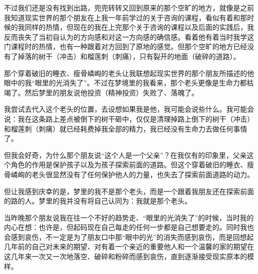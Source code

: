 不过我们还是没有找到出路，兜兜转转又回到原来的那个空旷的地方，就像是之前我知道现实世界的那个朋友在上我一年前学过的关于咨询的课程，看似有着和那时候的我同样的热情，但现在的我在上完那个关于咨询的课程以及后面的实践后，我反而丧失了当初自认为的方向感和对这一方向感的确信感。看着他有着当时我学这门课程时的热情，也有一种跟着对方回到了原地的感觉。但那个空旷的地方已经没有了掉落的树干（冲击）和榴莲刺（刺痛），只有裂开的地面（破碎的道路）。

那个穿着破旧的睡衣、瘦骨嶙峋的老头让我联想起现实世界的那个朋友所描述的他眼中的我\pozhehao{}“眼里的光消失了”。不过在梦境里的我看来，那个老头更像是生命力都枯竭了。然后梦里的朋友说他投资（精神投资）失败了、落魄了。

我尝试去代入这个老头的位置，去设想如果我是他，我可能会说些什么。我可能会说：我在这条路上差点被倒下的树干砸中，仅仅是清理掉路上倒下的树干（冲击）和榴莲刺（刺痛）就已经耗费掉我全部的精力，我已经没有生命力去做任何事情了。

但我会好奇，为什么那个朋友说“这个人是一个父亲”？在我仅有的印象里，父亲这个角色的作用是保护孩子以及为孩子探索前面的道路。但这个穿着破旧的睡衣、瘦骨嶙峋的老头很显然没有了任何保护他人的力量，也失去了探索前面道路的动力。

但让我感到庆幸的是，梦里的我不是那个老头，而是一个跟着我朋友还在探索前面的路的人。梦里的我并没有将自己认同为：我就是那个老头。

当昨晚那个朋友说我在往一个不好的趋势走、“眼里的光消失了”的时候，当时我的内心在想：也许是，但起码现在自己每走的任何一步都是自己想要走的。同时我也会感到哀伤，不一定是为了朋友口中那“眼中的光”的消失而感到哀伤，而是回想起几年前的自己对未来的期望、对有着一个亲近的重要他人和一个温馨的家的期望在这几年来一次又一次地落空、破碎和粉碎而感到哀伤，直到逐渐接受现实原本的模样。


